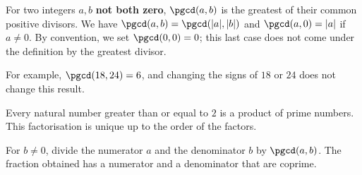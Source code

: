 \begin{cours}
For two integers $a,b$ \textbf{not both zero}, $\pgcd(a,b)$ is the greatest of their common positive divisors. We have $\pgcd(a,b)=\pgcd(|a|,|b|)$ and $\pgcd(a,0)=|a|$ if $a\ne0$. By convention, we set $\pgcd(0,0)=0$; this last case does not come under the definition by the greatest divisor.
\end{cours}
For example, $\pgcd(18,24)=6$, and changing the signs of $18$ or $24$ does not change this result.
\begin{cours}
Every natural number greater than or equal to $2$ is a product of prime numbers. This factorisation is unique up to the order of the factors.
\end{cours}
\begin{methode}
For $b\ne0$, divide the numerator $a$ and the denominator $b$ by $\pgcd(a,b)$. The fraction obtained has a numerator and a denominator that are coprime.
\end{methode}

